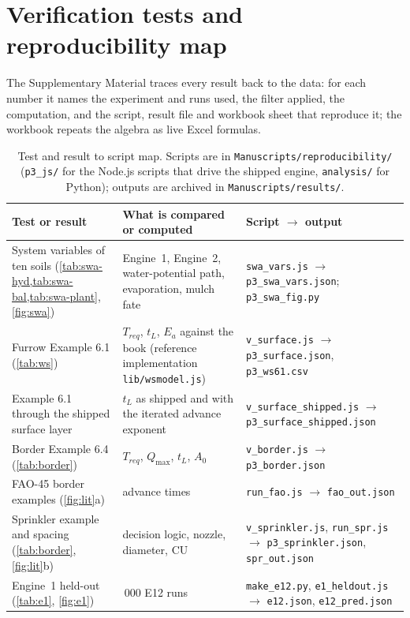\documentclass[preprint,12pt]{elsarticle}
\begin{document}
\section{Verification tests and reproducibility map}\label{app:repro}
The Supplementary Material traces every result back to the data: for each number it names the experiment and runs used, the filter applied, the computation, and the script, result file and workbook sheet that reproduce it; the workbook repeats the algebra as live Excel formulas.
\begin{table}[H]\centering\small
\caption{Test and result to script map. Scripts are in \texttt{Manuscripts/reproducibility/} (\texttt{p3\_js/} for the Node.js scripts that drive the shipped engine, \texttt{analysis/} for Python); outputs are archived in \texttt{Manuscripts/results/}.}
\begin{tabularx}{\textwidth}{>{\raggedright\arraybackslash}p{4.2cm}>{\raggedright\arraybackslash}p{3.6cm}X}
\toprule
Test or result & What is compared or computed & Script $\to$ output\\\midrule
System variables of ten soils (\cref{tab:swa-hyd,tab:swa-bal,tab:swa-plant}, \cref{fig:swa}) & Engine~1, Engine~2, water-potential path, evaporation, mulch fate & \texttt{swa\_vars.js} $\to$ \texttt{p3\_swa\_vars.json}; \texttt{p3\_swa\_fig.py}\\
Furrow Example 6.1 (\cref{tab:ws}) & $T_{req}$, $t_L$, $E_a$ against the book (reference implementation \texttt{lib/wsmodel.js}) & \texttt{v\_surface.js} $\to$ \texttt{p3\_surface.json}, \texttt{p3\_ws61.csv}\\
Example 6.1 through the shipped surface layer & $t_L$ as shipped and with the iterated advance exponent & \texttt{v\_surface\_shipped.js} $\to$ \texttt{p3\_surface\_shipped.json}\\
Border Example 6.4 (\cref{tab:border}) & $T_{req}$, $Q_{\max}$, $t_L$, $A_0$ & \texttt{v\_border.js} $\to$ \texttt{p3\_border.json}\\
FAO-45 border examples (\cref{fig:lit}a) & 13 advance times & \texttt{run\_fao.js} $\to$ \texttt{fao\_out.json}\\
Sprinkler example and spacing (\cref{tab:border}, \cref{fig:lit}b) & decision logic, nozzle, diameter, CU & \texttt{v\_sprinkler.js}, \texttt{run\_spr.js} $\to$ \texttt{p3\_sprinkler.json}, \texttt{spr\_out.json}\\
Engine~1 held-out (\cref{tab:e1}, \cref{fig:e1}) & 1\,000 E12 runs & \texttt{make\_e12.py}, \texttt{e1\_heldout.js} $\to$ \texttt{e12.json}, \texttt{e12\_pred.json}\\

\end{tabularx}
\end{table}
\end{document}
